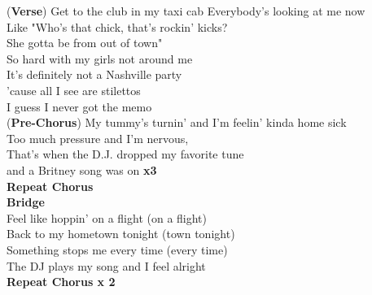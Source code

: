 (\textbf{Verse}) Get to the club in my taxi cab Everybody's looking at me now\\
Like "Who's that chick, that's rockin' kicks?\\
She gotta be from out of town"\\
So hard with my girls not around me\\
It's definitely not a Nashville party\\
'cause all I see are stilettos\\
I guess I never got the memo\\
(\textbf{Pre-Chorus}) My tummy's turnin' and I'm feelin' kinda home sick\\
Too much pressure and I'm nervous,\\
That's when the D.J. dropped my favorite tune\\
and a Britney song was on  \textbf{x3}\\
\textbf{Repeat Chorus}\\
\textbf{Bridge}\\
Feel like hoppin' on a flight (on a flight)\\
Back to my hometown tonight (town tonight)\\
Something stops me every time (every time)\\
The DJ plays my song and I feel alright\\
\textbf{Repeat Chorus x 2}\\
